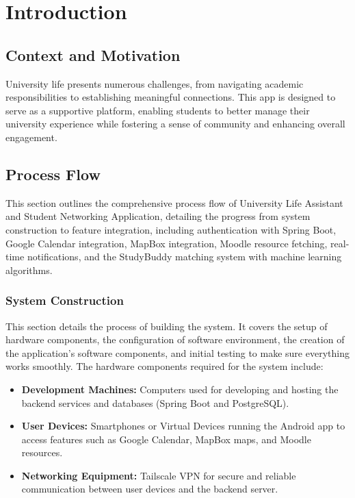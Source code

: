 \documentclass{article}
\makeatletter
\newcommand\subsubsubsection{\@startsection{paragraph}{4}{\z@}{-2.5ex\@plus -1ex \@minus -.25ex}{1.25ex \@plus .25ex}{\normalfont\normalsize\bfseries}}
\makeatother
\begin{document}


\tableofcontents
\newpage

\listfigurename
\newpage

\listtablename
\newpage



\section{Introduction}

\subsection{Context and Motivation}
\noindent University life presents numerous challenges, 
from navigating academic responsibilities to establishing meaningful connections. 
This app is designed to serve as a supportive platform, 
enabling students to better manage their university experience while 
fostering a sense of community and enhancing overall engagement.

\subsection{Process Flow}
This section outlines the comprehensive process flow of University Life Assistant and Student Networking Application,
detailing the progress from system construction to feature integration,
including authentication with Spring Boot, Google Calendar integration, MapBox integration, Moodle resource fetching, real-time notifications, and the StudyBuddy matching system with machine learning algorithms.
\subsubsection{System Construction}
This section details the process of building the system.
It covers the setup of hardware components, the configuration of software environment,
the creation of the application's software components, and initial testing to make sure everything works smoothly.
\subsubsubsection{Hardware Setup}
The hardware components required for the system include:
\begin{itemize}
    \item \textbf{Development Machines: }Computers used for developing and hosting the backend services and databases (Spring Boot and PostgreSQL).
    \item \textbf{User Devices: }Smartphones or Virtual Devices running the Android app to access features such as Google Calendar, MapBox maps, and Moodle resources.
    \item \textbf{Networking Equipment: }Tailscale VPN for secure and reliable communication between user devices and the backend server.
\end{itemize}
\end{document}
